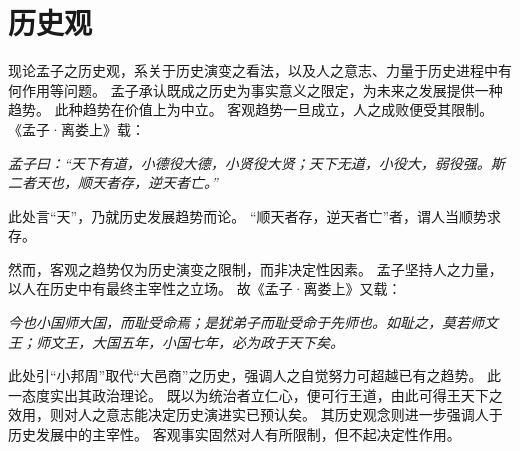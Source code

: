 \documentclass[11pt]{article}
\begin{document}
\section{历史观}
现论孟子之历史观，系关于历史演变之看法，以及人之意志、力量于历史进程中有何作用等问题。
孟子承认既成之历史为事实意义之限定，为未来之发展提供一种趋势。
此种趋势在价值上为中立。
客观趋势一旦成立，人之成败便受其限制。
《孟子·离娄上》载：

\textit{孟子曰：“天下有道，小德役大德，小贤役大贤；天下无道，小役大，弱役强。斯二者天也，顺天者存，逆天者亡。”}

此处言“天”，乃就历史发展趋势而论。
“顺天者存，逆天者亡”者，谓人当顺势求存。

\par

然而，客观之趋势仅为历史演变之限制，而非决定性因素。
孟子坚持人之力量，以人在历史中有最终主宰性之立场。
故《孟子·离娄上》又载：

\textit{今也小国师大国，而耻受命焉；是犹弟子而耻受命于先师也。如耻之，莫若师文王；师文王，大国五年，小国七年，必为政于天下矣。}

此处引“小邦周”取代“大邑商”之历史，强调人之自觉努力可超越已有之趋势。
此一态度实出其政治理论。
既以为统治者立仁心，便可行王道，由此可得王天下之效用，则对人之意志能决定历史演进实已预认矣。
其历史观念则进一步强调人于历史发展中的主宰性。
客观事实固然对人有所限制，但不起决定性作用。
\end{document}
